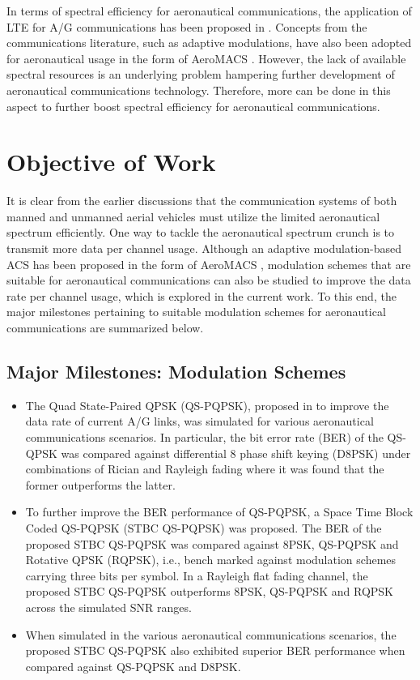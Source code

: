 In terms of spectral efficiency for aeronautical communications, the application of LTE for A/G communications has been proposed in \cite{AlcatelSrat}. Concepts from the communications literature, such as adaptive modulations, have also been adopted for aeronautical usage in the form of AeroMACS \cite{budinger2011aeronautical}. However, the lack of available spectral resources is an underlying problem hampering further development of aeronautical communications technology. Therefore, more can be done in this aspect to further boost spectral efficiency for aeronautical communications.

\section{Objective of Work}
It is clear from the earlier discussions that the communication systems of both manned and unmanned aerial vehicles must utilize the limited aeronautical spectrum efficiently. One way to tackle the aeronautical spectrum crunch is to transmit more data per channel usage. Although an adaptive modulation-based ACS has been proposed in the form of AeroMACS \cite{budinger2011aeronautical}, modulation schemes that are suitable for aeronautical communications can also be studied to improve the data rate per channel usage, which is explored in the current work. To this end, the major milestones pertaining to suitable modulation schemes for aeronautical communications are summarized below.

\subsection{Major Milestones: Modulation Schemes}
\begin{itemize}
	\item The Quad State-Paired QPSK (QS-PQPSK), proposed in \cite{tan2016quad} to improve the data rate of current A/G links, was simulated for various aeronautical communications scenarios. In particular, the bit error rate (BER) of the QS-QPSK was compared against differential 8 phase shift keying (D8PSK) under  combinations of Rician and Rayleigh fading where it was found that the former outperforms the latter.
	\item To further improve the BER performance of QS-PQPSK, a Space Time Block Coded QS-PQPSK (STBC QS-PQPSK) was proposed. The BER of the proposed STBC QS-PQPSK was compared against 8PSK, QS-PQPSK and Rotative QPSK (RQPSK), i.e., bench marked against modulation schemes carrying three bits per symbol. In a Rayleigh flat fading channel, the proposed STBC QS-PQPSK outperforms 8PSK, QS-PQPSK and RQPSK across the simulated SNR ranges. 
	\item When simulated in the various aeronautical communications scenarios, the proposed STBC QS-PQPSK also exhibited superior BER performance when compared against QS-PQPSK and D8PSK.
\end{itemize}

